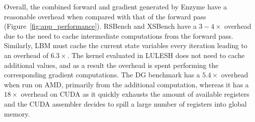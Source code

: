 Overall, the combined forward and gradient generated by Enzyme have a reasonable overhead when compared with that  of the forward pass (Figure~\ref{fig:app_performance}). RSBench and XSBench have a $3-4\times$ overhead due to the need to cache intermediate computations from the forward pass. Similarly, LBM must cache the current state variables every iteration leading to an overhead of $6.3\times$. The kernel evaluated in LULESH does not need to cache additional values, and as a result the \change{$2.01\times$} overhead is spent performing the corresponding gradient computations. The DG benchmark has a $5.4\times$ overhead when run on AMD, primarily from the additional computation, whereas it has a $18\times$ overhead on CUDA as it quickly exhausts the amount of available registers and the CUDA assembler decides to spill a large number of registers into global memory.

